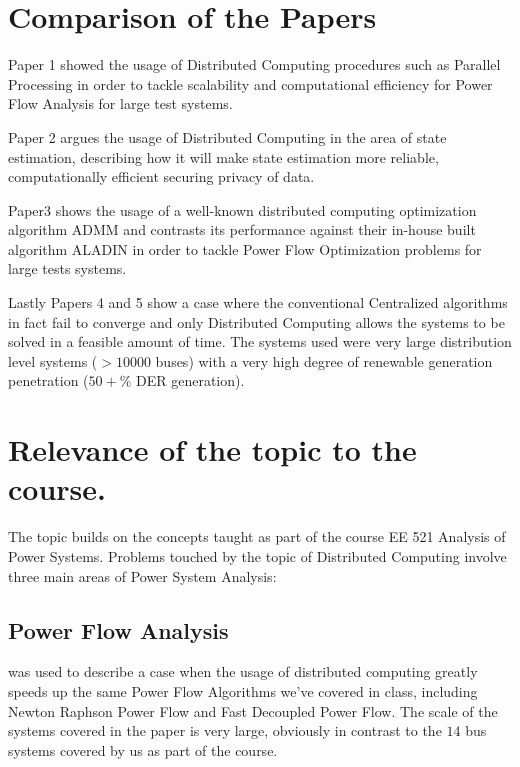 \documentclass[journal]{IEEEtran}
\begin{document}
\section{Comparison of the Papers}

Paper 1 \cite{fastNRPFBasedOnSparseTechniquesAndParallelProcessing} showed the usage of Distributed Computing procedures such as Parallel Processing in order to tackle scalability and computational efficiency for Power Flow Analysis for large test systems.

Paper 2 \cite{gomez_exposito_multilevelStateEstimationParadigm} argues the usage of Distributed Computing in the area of state estimation, describing how it will make state estimation more reliable, computationally efficient securing privacy of data.

Paper3 \cite{aladinAlgorithmPaper} shows the usage of a well-known distributed computing optimization algorithm ADMM and contrasts its performance against their in-house built algorithm ALADIN in order to tackle Power Flow Optimization problems for large tests systems.

Lastly Papers 4 and 5 \cite{rabayet01, rabayet02} show a case where the conventional Centralized algorithms in fact fail to converge and only Distributed Computing allows the systems to be solved in a feasible amount of time. The systems used were very large distribution level systems ($>10000 $ buses) with a very high degree of renewable generation penetration ($50+\%$ DER generation).

\section{Relevance of the topic to the course.}

The topic builds on the concepts taught as part of the course EE 521 Analysis of Power Systems. Problems touched by the topic of Distributed Computing involve three main areas of Power System Analysis:

\subsection{Power Flow Analysis}
\cite{fastNRPFBasedOnSparseTechniquesAndParallelProcessing} was used to describe a case when the usage of distributed computing greatly speeds up the same Power Flow Algorithms we've covered in class, including Newton Raphson Power Flow and Fast Decoupled Power Flow. The scale of the systems covered in the paper is very large, obviously in contrast to the $14$ bus systems covered by us as part of the course.
\end{document}
